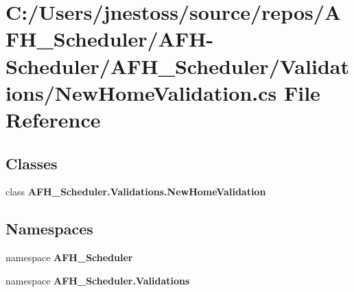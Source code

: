 \section{C\+:/\+Users/jnestoss/source/repos/\+A\+F\+H\+\_\+\+Scheduler/\+A\+F\+H-\/\+Scheduler/\+A\+F\+H\+\_\+\+Scheduler/\+Validations/\+New\+Home\+Validation.cs File Reference}
\label{_new_home_validation_8cs}
\subsection*{Classes}
\begin{DoxyCompactItemize}
\item 
class \textbf{ A\+F\+H\+\_\+\+Scheduler.\+Validations.\+New\+Home\+Validation}
\end{DoxyCompactItemize}
\subsection*{Namespaces}
\begin{DoxyCompactItemize}
\item 
namespace \textbf{ A\+F\+H\+\_\+\+Scheduler}
\item 
namespace \textbf{ A\+F\+H\+\_\+\+Scheduler.\+Validations}
\end{DoxyCompactItemize}

